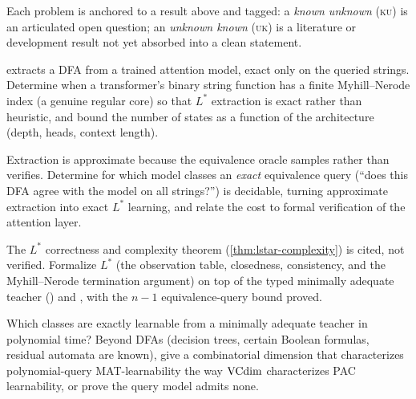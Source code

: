 Each problem is anchored to a result above and tagged: a \emph{known unknown} (\textsc{ku}) is an articulated open question; an \emph{unknown known} (\textsc{uk}) is a literature or development result not yet absorbed into a clean statement.

\begin{openprob}
\label{op:transformer-regular}
 extracts a DFA from a trained attention model, exact only on the queried strings.  Determine when a transformer's binary string function has a finite Myhill--Nerode index (a genuine regular core) so that $L^*$ extraction is exact rather than heuristic, and bound the number of states as a function of the architecture (depth, heads, context length).
\end{openprob}

\begin{openprob}
\label{op:exact-eq-oracle}
Extraction is approximate because the equivalence oracle samples rather than verifies.  Determine for which model classes an \emph{exact} equivalence query (``does this DFA agree with the model on all strings?'') is decidable, turning approximate extraction into exact $L^*$ learning, and relate the cost to formal verification of the attention layer.
\end{openprob}

\begin{openprob}
\label{op:lstar-formal}
The $L^*$ correctness and complexity theorem (\cref{thm:lstar-complexity}) is cited, not verified.  Formalize $L^*$ (the observation table, closedness, consistency, and the Myhill--Nerode termination argument) on top of the typed minimally adequate teacher () and , with the $n-1$ equivalence-query bound proved.
\end{openprob}

\begin{openprob}
\label{op:mat-dimension}
Which classes are exactly learnable from a minimally adequate teacher in polynomial time?  Beyond DFAs (decision trees, certain Boolean formulas, residual automata are known), give a combinatorial dimension that characterizes polynomial-query MAT-learnability the way $\mathrm{VCdim}$ characterizes PAC learnability, or prove the query model admits none.
\end{openprob}

